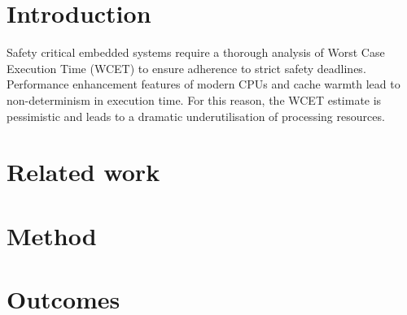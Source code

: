 \documentclass[10pt]{article}
\begin{document}
\maketitle



\section{Introduction}

Safety critical embedded systems require a thorough analysis of Worst Case Execution Time (WCET)
to ensure adherence to strict safety deadlines. Performance enhancement features of modern
CPUs and cache warmth lead to non-determinism in execution time. For this reason, the WCET estimate
is pessimistic and leads to a dramatic underutilisation of processing resources.

\section{Related work}

\section{Method}



\section{Outcomes}
\end{document}
